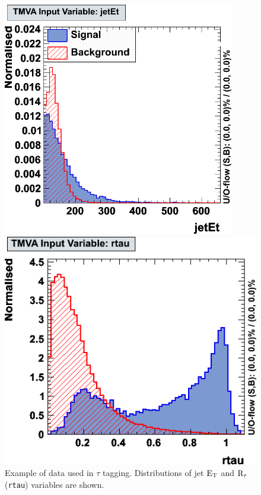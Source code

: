 \documentclass[a4paper]{jpconf}
\begin{document}
\begin{figure}[h]
 \begin{minipage}{7.8cm}
\includegraphics[width=0.9\textwidth]{images/jetet.png}
\end{minipage}
 \hfill
\begin{minipage}{7.8cm}
\includegraphics[width=1.0\textwidth]{images/rtau.png}
\end{minipage}

\caption{Example of data used in $\tau$ tagging.
Distributions of jet ${\rm E}_{\rm T}$ and ${\rm R}_{\tau}$ ({\tt rtau}) variables are shown.}
\label{fig:variables}
\end{figure}
\end{document}
